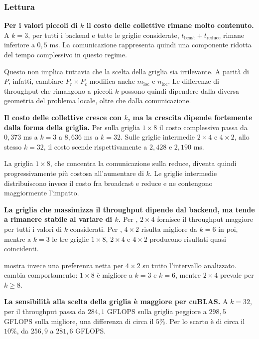 \subsubsection*{Lettura}

\textbf{Per i valori piccoli di $k$ il costo delle collettive rimane molto
contenuto.}
A $k=3$, per tutti i backend e tutte le griglie considerate,
$t_{\mathrm{bcast}}+t_{\mathrm{reduce}}$ rimane inferiore a $0{,}5$ ms.
La comunicazione rappresenta quindi una componente ridotta del tempo
complessivo in questo regime.

Questo non implica tuttavia che la scelta della griglia sia irrilevante.
A parità di $P$, infatti, cambiare $P_r\times P_c$ modifica anche
$m_{\mathrm{loc}}$ e $n_{\mathrm{loc}}$. Le differenze di throughput che
rimangono a piccoli $k$ possono quindi dipendere dalla diversa geometria del
problema locale, oltre che dalla comunicazione.

\textbf{Il costo delle collettive cresce con $k$, ma la crescita dipende
fortemente dalla forma della griglia.}
Per  sulla griglia $1\times8$ il costo complessivo
passa da $0{,}373$ ms a $k=3$ a $8{,}636$ ms a $k=32$.
Sulle griglie intermedie $2\times4$ e $4\times2$, allo stesso $k=32$, il
costo scende rispettivamente a $2{,}428$ e $2{,}190$ ms.

La griglia $1\times8$, che concentra la comunicazione sulla reduce, diventa
quindi progressivamente più costosa all'aumentare di $k$. Le griglie
intermedie distribuiscono invece il costo fra broadcast e reduce e ne
contengono maggiormente l'impatto.

\textbf{La griglia che massimizza il throughput dipende dal backend, ma tende
a rimanere stabile al variare di $k$.}
Per , $2\times4$ fornisce il throughput maggiore per
tutti i valori di $k$ considerati. Per
, $4\times2$ risulta migliore da $k=6$ in poi,
mentre a $k=3$ le tre griglie $1\times8$, $2\times4$ e $4\times2$
producono risultati quasi coincidenti.

 mostra invece una preferenza netta per $4\times2$ su
tutto l'intervallo analizzato.  cambia comportamento:
$1\times8$ è migliore a $k=3$ e $k=6$, mentre $2\times4$ prevale per
$k\ge8$.

\textbf{La sensibilità alla scelta della griglia è maggiore per cuBLAS.}
A $k=32$, per  il throughput passa da
$284{,}1$ GFLOPS sulla griglia peggiore a $298{,}5$ GFLOPS sulla migliore,
una differenza di circa il $5\%$.
Per  lo scarto è di circa il $10\%$,
da $256{,}9$ a $281{,}6$ GFLOPS.

